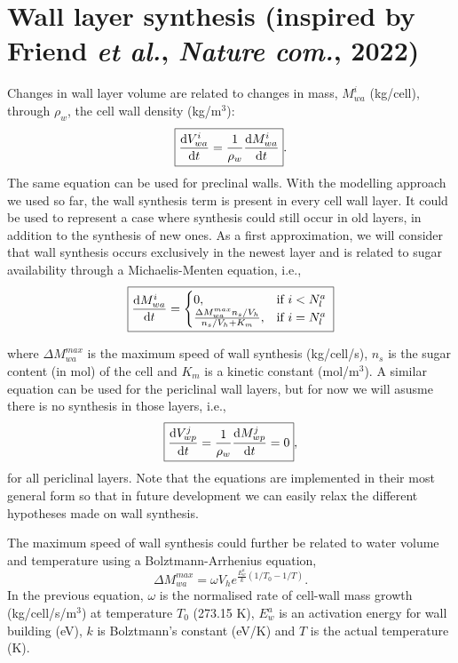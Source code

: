 \documentclass[]{article}
\begin{document}
\section{Wall layer synthesis (inspired by Friend \textit{et al.}, \textit{Nature com.}, 2022)}
Changes in wall layer volume are related to changes in mass, $M_{wa}^i$ (kg/cell), through $\rho_w$, the cell wall density (kg/m$^3$):
\begin{equation}
	\boxed{
		\frac{{\rm d} V_{wa}^i}{{\rm d} t}=\frac{1}{\rho_w}\frac{{\rm d} M_{wa}^i}{{\rm d} t}}.
\end{equation}
The same equation can be used for preclinal walls. With the modelling approach we used so far, the wall synthesis term is present in every cell wall layer. It could be used to represent a case where synthesis could still occur in old layers, in addition to the synthesis of new ones. As a first approximation, we will consider that wall synthesis occurs exclusively in the newest layer and is related to sugar availability through a Michaelis-Menten equation, i.e.,
\begin{equation}
	\boxed{
	\frac{{\rm d} M_{wa}^i}{{\rm d} t} = \begin{cases}
		0, & \text{if } i < N_l^a \\
		\frac{\Delta{M_{wa}^{max}}n_s/V_h}{n_s/V_h + K_m}, & \text{if } i = N_l^a
	\end{cases} \\}
\end{equation}

where $\Delta M_{wa}^{max}$ is the maximum speed of wall synthesis (kg/cell/s), $n_s$ is the sugar content (in mol) of the cell and $K_m$ is a kinetic constant (mol/m$^3$). A similar equation can be used for the periclinal wall layers, but for now we will asusme there is no synthesis in those layers, i.e.,
\begin{equation}
	\boxed{
		\frac{{\rm d} V_{wp}^j}{{\rm d} t}=\frac{1}{\rho_w}\frac{{\rm d} M_{wp}^j}{{\rm d} t}=0},
\end{equation}
for all periclinal layers. Note that the equations are implemented in their most general form so that in future development we can easily relax the different hypotheses made on wall synthesis.

The maximum speed of wall synthesis could further be related to water volume and temperature using a Bolztmann-Arrhenius equation,
\begin{equation}
	\boxed{
		\Delta M_{wa}^{max}=\omega V_h e^{\frac{E^a_w}{k}(1/T_0-1/T)}}.
\end{equation}
In the previous equation, $\omega$ is the normalised rate of cell-wall mass growth (kg/cell/s/m$^3$) at temperature $T_0$ (273.15 K), $E_w^a$ is an activation energy for wall building (eV), $k$ is Bolztmann's constant (eV/K) and $T$ is the actual temperature (K).
\end{document}
